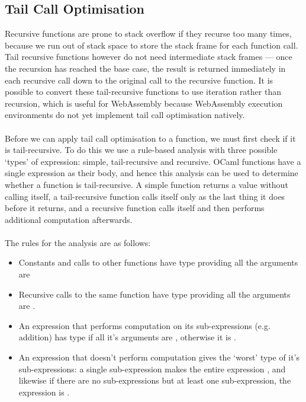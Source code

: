\subsection{Tail Call Optimisation}
Recursive functions are prone to stack overflow if they recurse too many times, because we run out of stack space to store the stack frame for each function call. Tail recursive functions however do not need intermediate stack frames --- once the recursion has reached the base case, the result is returned immediately in each recursive call down to the original call to the recursive function. It is possible to convert these tail-recursive functions to use iteration rather than recursion, which is useful for WebAssembly because WebAssembly execution environments do not yet implement tail call optimisation natively.
\\\\
Before we can apply tail call optimisation to a function, we must first check if it is tail-recursive. To do this we use a rule-based analysis with three possible `types' of expression: simple, tail-recursive and recursive. OCaml functions have a single expression as their body, and hence this analysis can be used to determine whether a function is tail-recursive. A simple function returns a value without calling itself, a tail-recursive function calls itself only as the last thing it does before it returns, and a recursive function calls itself and then performs additional computation afterwards.
\\\\
The rules for the analysis are as follows:
\begin{itemize}
\item Constants and calls to other functions have type  providing all the arguments are 
\item Recursive calls to the same function have type  providing all the arguments are .
\item An expression that performs computation on its sub-expressions (e.g. addition) has type  if all it's arguments are , otherwise it is .
\item An expression that doesn't perform computation gives the `worst' type of it's sub-expressions: a single  sub-expression makes the entire expression , and likewise if there are no  sub-expressions but at least one  sub-expression, the expression is .
\end{itemize}
